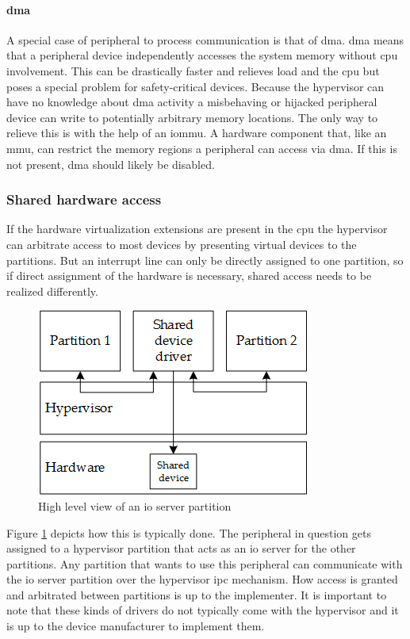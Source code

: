 \paragraph{\acrshort{dma}}
A special case of peripheral to process communication is that of \acrfull{dma}. \acrshort{dma} means that a peripheral device independently accesses the system memory without \acrshort{cpu} involvement. This can be drastically faster and relieves load and the \acrshort{cpu} but poses a special problem for safety-critical devices. Because the hypervisor can have no knowledge about \acrshort{dma} activity a misbehaving or hijacked peripheral device can write to potentially arbitrary memory locations. The only way to relieve this is with the help of an \acrfull{iommu}. A hardware component that, like an \acrshort{mmu}, can restrict the memory regions a peripheral can access via \acrshort{dma}.
If this is not present, \acrshort{dma} should likely be disabled.

\subsubsection{Shared hardware access}
If the hardware virtualization extensions are present in the \acrshort{cpu} the hypervisor can arbitrate access to most devices by presenting virtual devices to the partitions.
But an interrupt line can only be directly assigned to one partition, so if direct assignment of the hardware is necessary, shared access needs to be realized differently. 

\begin{figure}[hbt!]
\centering
\includegraphics[scale=0.75]{Figures/shared_driver.png}
\decoRule
\caption{High level view of an \acrshort{io} server partition}
\label{fig:shared_driver}
\end{figure}
Figure \ref{fig:shared_driver} depicts how this is typically done. The peripheral in question gets assigned to a hypervisor partition that acts as an \acrshort{io} server for the other partitions. Any partition that wants to use this peripheral can communicate with the \acrshort{io} server partition over the hypervisor \acrshort{ipc} mechanism. How access is granted and arbitrated between partitions is up to the implementer. It is important to note that these kinds of drivers do not typically come with the hypervisor and it is up to the device manufacturer to implement them.

